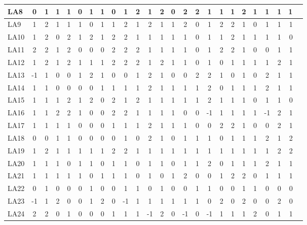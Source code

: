 \begin{table}[h!]
\begin{tabular}{|l|*{23}{c|}}
        LA8 & 0 & 1 & 1 & 1 & 0 & 1 & 1 & 0 & 1 & 2 & 1 & 2 & 0 & 2 & 2 & 1 & 1 & 1 & 2 & 1 & 1 & 1 & 1 ~\\ \hline
        LA9 & 1 & 2 & 1 & 1 & 1 & 0 & 1 & 1 & 2 & 1 & 2 & 1 & 1 & 2 & 0 & 1 & 2 & 2 & 1 & 0 & 1 & 1 & 1 ~\\ \hline
        LA10 & 1 & 2 & 0 & 2 & 1 & 2 & 1 & 2 & 2 & 1 & 1 & 1 & 1 & 1 & 0 & 1 & 1 & 2 & 1 & 1 & 1 & 1 & 0 ~\\ \hline
        LA11 & 2 & 2 & 1 & 2 & 0 & 0 & 0 & 2 & 2 & 2 & 1 & 1 & 1 & 1 & 0 & 1 & 2 & 2 & 1 & 0 & 0 & 1 & 1 ~\\ \hline
        LA12 & 1 & 2 & 1 & 2 & 1 & 1 & 1 & 2 & 2 & 2 & 1 & 2 & 1 & 1 & 0 & 1 & 0 & 1 & 1 & 1 & 1 & 2 & 1 ~\\ \hline
        LA13 & -1 & 1 & 0 & 0 & 1 & 2 & 1 & 0 & 0 & 1 & 2 & 1 & 0 & 0 & 2 & 2 & 1 & 0 & 1 & 0 & 2 & 1 & 1 ~\\ \hline
        LA14 & 1 & 1 & 0 & 0 & 0 & 0 & 1 & 1 & 1 & 1 & 2 & 1 & 1 & 1 & 1 & 2 & 0 & 1 & 1 & 1 & 2 & 1 & 1 ~\\ \hline
        LA15 & 1 & 1 & 1 & 2 & 1 & 2 & 0 & 2 & 1 & 2 & 1 & 1 & 1 & 1 & 1 & 2 & 1 & 1 & 1 & 0 & 1 & 1 & 0 ~\\ \hline
        LA16 & 1 & 1 & 2 & 2 & 1 & 0 & 0 & 2 & 2 & 1 & 1 & 1 & 1 & 0 & 0 & -1 & 1 & 1 & 1 & 1 & -1 & 2 & 1 ~\\ \hline
        LA17 & 1 & 1 & 1 & 1 & 0 & 0 & 0 & 1 & 1 & 1 & 2 & 1 & 1 & 1 & 0 & 0 & 2 & 2 & 1 & 0 & 0 & 2 & 1 ~\\ \hline
        LA18 & 0 & 0 & 1 & 1 & 0 & 0 & 0 & 0 & 1 & 0 & 2 & 1 & 0 & 1 & 1 & 1 & 0 & 1 & 1 & 1 & 2 & 1 & 2 ~\\ \hline
        LA19 & 1 & 2 & 1 & 1 & 1 & 1 & 1 & 2 & 2 & 1 & 1 & 1 & 1 & 1 & 1 & 1 & 1 & 1 & 1 & 1 & 1 & 2 & 2 ~\\ \hline
        LA20 & 1 & 1 & 1 & 0 & 1 & 1 & 0 & 1 & 1 & 0 & 1 & 1 & 0 & 1 & 1 & 2 & 0 & 1 & 1 & 1 & 2 & 1 & 1 ~\\ \hline
        LA21 & 1 & 1 & 1 & 1 & 1 & 0 & 1 & 1 & 1 & 0 & 1 & 0 & 1 & 2 & 0 & 0 & 1 & 2 & 2 & 0 & 1 & 1 & 1 ~\\ \hline
        LA22 & 0 & 1 & 0 & 0 & 0 & 1 & 0 & 0 & 1 & 1 & 0 & 1 & 0 & 0 & 1 & 1 & 0 & 0 & 1 & 1 & 0 & 0 & 0 ~\\ \hline
        LA23 & -1 & 1 & 2 & 0 & 0 & 1 & 2 & 0 & -1 & 1 & 1 & 1 & 1 & 1 & 1 & 0 & 2 & 0 & 2 & 0 & 0 & 2 & 0 ~\\ \hline
        LA24 & 2 & 2 & 0 & 1 & 0 & 0 & 0 & 1 & 1 & 1 & -1 & 2 & 0 & -1 & 0 & -1 & 1 & 1 & 1 & 2 & 0 & 1 & 1 ~\\ \hline

\end{tabular}
\end{table}
